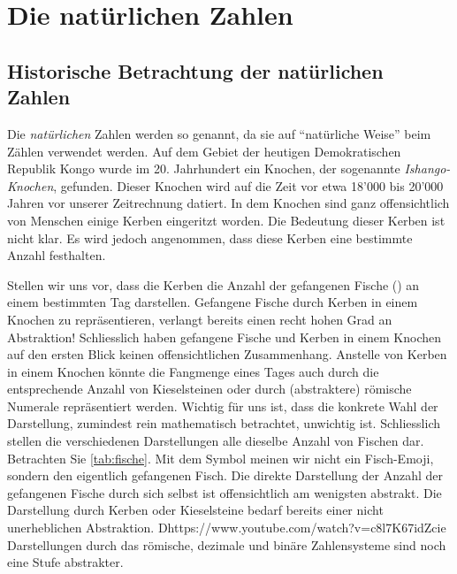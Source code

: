 \chapter{Die natürlichen Zahlen}\label{ch:Kapitel01}
\section{Historische Betrachtung der natürlichen Zahlen}\label{sec:history}
Die \textit{natürlichen} Zahlen werden so genannt, da sie auf \enquote{natürliche Weise} beim Zählen verwendet werden. Auf dem Gebiet der heutigen Demokratischen Republik Kongo wurde im 20. Jahrhundert ein Knochen, der sogenannte \textit{Ishango-Knochen}, gefunden. Dieser Knochen wird auf die Zeit vor etwa 18'000 bis 20'000 Jahren vor unserer Zeitrechnung datiert. In dem Knochen sind ganz offensichtlich von Menschen einige Kerben eingeritzt worden. Die Bedeutung dieser Kerben ist nicht klar. Es wird jedoch angenommen, dass diese Kerben eine bestimmte Anzahl festhalten.

Stellen wir uns vor, dass die Kerben die Anzahl der gefangenen Fische () an einem bestimmten Tag darstellen. Gefangene Fische durch Kerben in einem Knochen zu repräsentieren, verlangt bereits einen recht hohen Grad an Abstraktion! Schliesslich haben gefangene Fische und Kerben in einem Knochen auf den ersten Blick keinen offensichtlichen Zusammenhang. Anstelle von Kerben in einem Knochen könnte die Fangmenge eines Tages auch durch die entsprechende Anzahl von Kieselsteinen oder durch (abstraktere) römische Numerale repräsentiert werden. Wichtig für uns ist, dass die konkrete Wahl der Darstellung, zumindest rein mathematisch betrachtet, unwichtig ist. Schliesslich stellen die verschiedenen Darstellungen alle dieselbe Anzahl von Fischen dar. Betrachten Sie \cref{tab:fische}. Mit dem Symbol  meinen wir nicht ein Fisch-Emoji, sondern den eigentlich gefangenen Fisch. Die direkte Darstellung der Anzahl der gefangenen Fische durch sich selbst ist offensichtlich am wenigsten abstrakt. Die Darstellung durch Kerben oder Kieselsteine bedarf bereits einer nicht unerheblichen Abstraktion. Dhttps://www.youtube.com/watch?v=c8l7K67idZcie Darstellungen durch das römische, dezimale und binäre Zahlensysteme sind noch eine Stufe abstrakter.


